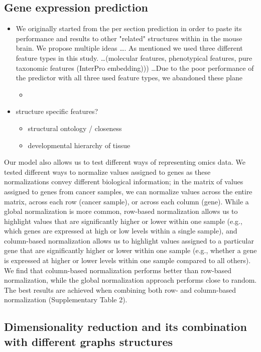 \documentclass[]{article}
\begin{document}
\subsection{Gene expression prediction}

\begin{itemize}
	\item We originally started from the per section prediction in order to paste its performance and results to other "related" structures within in the mouse brain. We propose multiple ideas \dots. As mentioned we used three different feature types in this study. \dots (molecular features, phenotypical features, pure taxonomic features (InterPro embedding))) \dots Due to the poor performance of the predictor with all three used feature types, we abandoned these plane
	\begin{itemize}
		\item 
	\end{itemize}
	\item structure specific features?
	\begin{itemize}
		\item structural ontology / closeness
		\item developmental hierarchy of tissue
	\end{itemize}
\end{itemize}

Our model also allows us to test different ways of representing omics data. We
tested different ways to normalize values assigned to genes as these normalizations
convey different biological information; in the matrix of values assigned to genes from
cancer samples, we can normalize values across the entire matrix, across each row
(cancer sample), or across each column (gene). While a global normalization is more
common, row-based normalization allows us to highlight values that are significantly
higher or lower within one sample (e.g., which genes are expressed at high or low levels within a single sample), and column-based normalization allows us to highlight values
assigned to a particular gene that are significantly higher or lower within one sample
(e.g., whether a gene is expressed at higher or lower levels within one sample compared
to all others). We find that column-based normalization performs better than row-based
normalization, while the global normalization approach performs close to random. The
best results are achieved when combining both row- and column-based normalization
(Supplementary Table 2).	

\subsection{Dimensionality reduction and its combination with different graphs structures}
\end{document}
